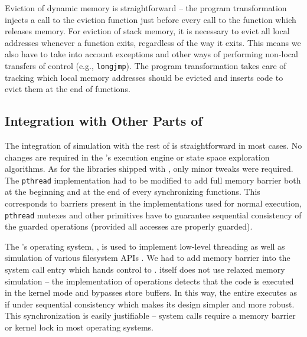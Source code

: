 Eviction of dynamic memory is straightforward -- the program transformation injects a call to the eviction function just before every call to the function which releases memory.
For eviction of stack memory, it is necessary to evict all local addresses whenever a function exits, regardless of the way it exits.
This means we also have to take into account exceptions and other ways of performing non-local transfers of control (e.g., \texttt{longjmp}).
The program transformation takes care of tracking which local memory addresses should be evicted and inserts code to evict them at the end of functions.

\subsection{Integration with Other Parts of \divine}

The integration of \xtso simulation with the rest of \divine is straightforward in most cases.
No changes are required in the \divine's execution engine or state space exploration algorithms.
As for the libraries shipped with \divine, only minor tweaks were required.
The \texttt{pthread} implementation had to be modified to add full memory barrier both at the beginning and at the end of every synchronizing functions.
This corresponds to barriers present in the implementations used for normal execution, \texttt{pthread} mutexes and other primitives have to guarantee sequential consistency of the guarded operations (provided all accesses are properly guarded).

The \divine's operating system, \dios, is used to implement low-level threading as well as simulation of various filesystem APIs .
We had to add memory barrier into the system call entry which hands control to \dios.
\dios itself does not use relaxed memory simulation -- the implementation of \xtso operations detects that the code is executed in the kernel mode and bypasses store buffers.
In this way, the entire \dios executes as if under sequential consistency which makes its design simpler and more robust.
This synchronization is easily justifiable -- system calls require a memory barrier or kernel lock in most operating systems.

